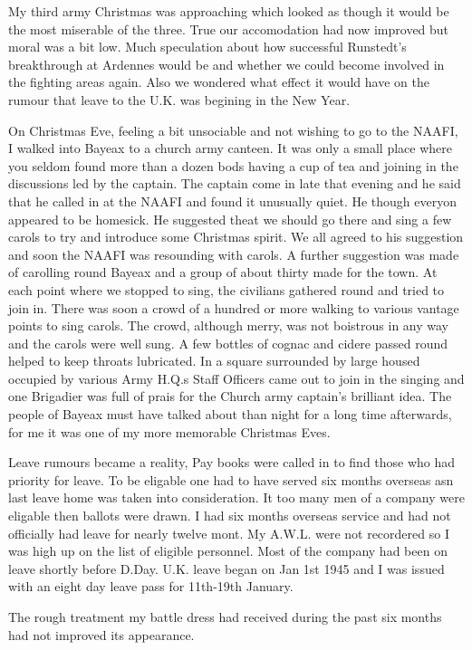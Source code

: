 My third army Christmas was approaching which looked as though it
would be the most miserable of the three. True our accomodation had
now improved but moral was a bit low. Much speculation about how
successful Runstedt's breakthrough at Ardennes would be and whether we
could become involved in the fighting areas again. Also we wondered
what effect it would have on the rumour that leave to the U.K. was
begining in the New Year.

On Christmas Eve, feeling a bit unsociable and not wishing to go to
the NAAFI, I walked into Bayeax to a church army canteen. It was only
a small place where you seldom found more than a dozen bods having a
cup of tea and joining in the discussions led by the captain. The
captain come in late that evening and he said that he called in at the
NAAFI and found it unusually quiet. He though everyon appeared to be
homesick. He suggested theat we should go there and sing a few carols
to try and introduce some Christmas spirit. We all agreed to his
suggestion and soon the NAAFI was resounding with carols. A further
suggestion was made of carolling round Bayeax and a group of about
thirty made for the town. At each point where we stopped to sing, the
civilians gathered round and tried to join in. There was soon a crowd
of a hundred or more walking to various vantage points to sing
carols. The crowd, although merry, was not boistrous in any way and
the carols were well sung. A few bottles of cognac and cidere passed
round helped to keep throats lubricated. In a square surrounded by
large housed occupied by various Army H.Q.s Staff Officers came out to
join in the singing and one Brigadier was full of prais for the Church
army captain's brilliant idea. The people of Bayeax must have talked
about than night for a long time afterwards, for me it was one of my
more memorable Christmas Eves.

Leave rumours became a reality, Pay books were called in to find those
who had priority for leave. To be eligable one had to have served six
months overseas asn last leave home was taken into consideration. It
too many men of a company were eligable then ballots were drawn. I had
six months overseas service and had not officially had leave for
nearly twelve mont. My A.W.L. were not recordered so I was high up on
the list of eligible personnel. Most of the company had been on leave
shortly before D.Day. U.K. leave began on Jan 1st 1945 and I was
issued with an eight day leave pass for 11th-19th January.

The rough treatment my battle dress had received during the past six
months had not improved its appearance.

